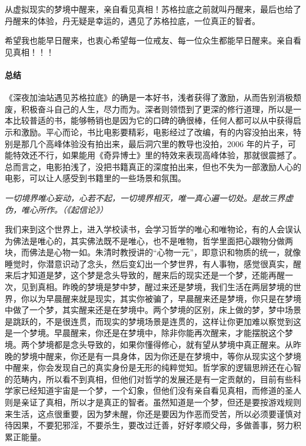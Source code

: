 从虚拟现实的梦境中醒来，亲自看见真相！苏格拉底之前就叫丹醒来，最后也给了丹醒来的体验，丹无疑是幸运的，遇见了苏格拉底，一位真正的智者。

希望我也能早日醒来，也衷心希望每一位戒友、每一位众生都能早日醒来。亲自看见真相！！！

\paragraph*{总结}

《深夜加油站遇见苏格拉底》的确是一本好书，浅者获得了激励，从而告别消极颓废，积极奋斗自己的人生，尽力而为。深者则领悟到了更深的修行道理，所以是一本比较普适的书，能够畅销也是因为它的口碑的确很棒，任何人都可以从中获得启示和激励。平心而论，书比电影要精彩，电影经过了改编，有的内容没拍出来，特别是那几个高峰体验没有拍出来，最后洞穴里的教导也没拍，2006 年的片子，可能特效还不行，如果能用《奇异博士》里的特效来表现高峰体验，那就很震撼了。总而言之，电影拍浅了，没把书籍真正的深度拍出来，但也不失为一部激励人心的电影，可以让人感受到书籍里的一些场景和氛围。

\textit{一切境界唯心妄动，心若不起，一切境界相灭，唯一真心遍一切处。是故三界虚伪，唯心所作。（《起信论》）}

我们来到这个世界上，进入学校读书，会学习哲学的唯心和唯物论，有的人会误认为佛法是唯心的，其实佛法既不是唯心，也不是唯物，哲学里面把心跟物分做两块，而佛法是心物一如。朱清时教授讲的“心物一元”，即意识和物质的统一，就像睡觉时，你潜意识动了念头，然后变幻出一个梦世界，有人事物，感觉很真实，醒来后才知道是梦，这个梦是念头导致的，醒来后的现实还是一个梦，还能再醒一次，见到真相。昨晚的梦境是梦中梦，醒过来还是梦境，我们生活在两层梦境的世界，你以为早晨醒来就是现实，其实你被骗了，早晨醒来还是梦境，你只是在梦境中做了一个梦，其实醒来还是在梦境中。两个梦境的区别，床上做的梦，梦中场景是跳跃的，不是很连贯，而现实的梦境场景是连贯的，这样让你更加难以察觉到这是一个梦境。早晨醒来，你还是在梦境中，除非你能再次醒来，才能摆脱这个梦境。两个梦境都是念头导致的，如果你懂得修心，就有望从梦境中真正醒来。从昨晚的梦境中醒来，你还是有一具身体，因为你还是在梦境中，等你从现实这个梦境中醒来，你会发现自己的真实身份是无形的纯粹觉知。哲学家的逻辑思辨还在心智的范畴内，所以看不到真相，但他们对哲学的发展还是有一定贡献的，目前有些科学家已经知道宇宙是一个梦，一个幻象，但他们没有亲自看见真相，而修道的圣人则是亲证了真相，所以才是真正的智者。虽然知道是一个梦，但还是要按游戏规则来生活，这点很重要，因为梦未醒，你还是要因为作恶而受苦，所以必须要谨慎对待因果，不要犯邪淫，不要杀生，要改过迁善，好好孝顺父母，多做善事，努力积累正能量。

